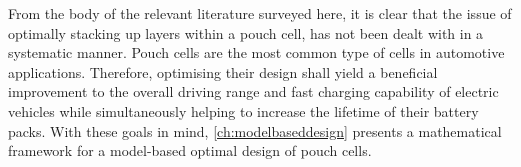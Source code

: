From the  body of the  relevant literature surveyed here,  it is clear  that the
issue of optimally  stacking up layers within  a pouch cell, has  not been dealt
with in a  systematic manner. Pouch cells  are the most common type  of cells in
automotive  applications.  Therefore,  optimising  their design  shall  yield  a
beneficial improvement to the overall driving range and fast charging capability
of electric  vehicles while simultaneously  helping to increase the  lifetime of
their  battery  packs.  With  these goals  in  mind,  \cref{ch:modelbaseddesign}
presents  a mathematical  framework for  a model-based  optimal design  of pouch
cells.


